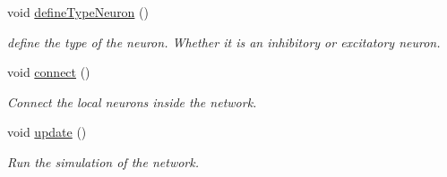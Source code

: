 \begin{DoxyCompactItemize}
void \hyperlink{classNetwork_ac3c2f344cd4d2006f26b2a455f065495}{define\-Type\-Neuron} ()
\begin{DoxyCompactList}\small\item\em define the type of the neuron. Whether it is an inhibitory or excitatory neuron. \end{DoxyCompactList}\item 
void \hyperlink{classNetwork_ad8089bfe777cff5283285629cd696173}{connect} ()
\begin{DoxyCompactList}\small\item\em Connect the local neurons inside the network. \end{DoxyCompactList}\item 
void \hyperlink{classNetwork_ab07bb6f6d9020b9eb230551083ea929f}{update} ()
\begin{DoxyCompactList}\small\item\em Run the simulation of the network. \end{DoxyCompactList}\end{DoxyCompactItemize}

